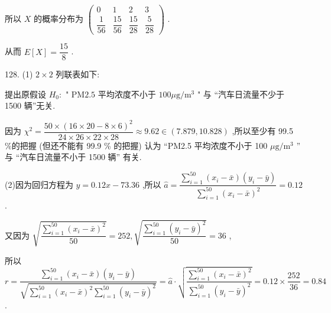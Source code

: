 所以 $X$ 的概率分布为 $\left( \begin{matrix} 0 & 1 & 2 & 3 \\  \dfrac{1}{56} & \dfrac{15}{56} & \dfrac{15}{28} & \dfrac{5}{28} \end{matrix}\right)$ .

从而 $E\left\lbrack  X\right\rbrack   = \dfrac{15}{8}$ .

128. (1) $2 \times  2$ 列联表如下:

\begin{center}
\end{center}

提出原假设 ${H}_{0} :$ " $\mathrm{{PM}}{2.5}$ 平均浓度不小于 ${100\mu }\mathrm{g}/{\mathrm{m}}^{3}$ " 与 “汽车日流量不少于 1500 辆”无关.

因为 ${\chi }^{2} = \dfrac{{50} \times  {\left( {16} \times  {20} - 8 \times  6\right) }^{2}}{{24} \times  {26} \times  {22} \times  {28}} \approx  {9.62} \in  \left( {{7.879},{10.828}}\right)$ ,所以至少有 99.5 \%的把握 (但还不能有 99.9 \% 的把握) 认为 “PM2.5 平均浓度不小于 100 $\mu \mathrm{g}/{\mathrm{m}}^{3}$ ” 与 “汽车日流量不小于 1500 辆” 有关.

(2)因为回归方程为 $y = {0.12x} - {73.36}$ ,所以 $\widehat{a} = \dfrac{\mathop{\sum }\limits_{{i = 1}}^{{50}}\left( {{x}_{i} - \bar{x}}\right) \left( {{y}_{i} - \bar{y}}\right) }{\mathop{\sum }\limits_{{i = 1}}^{{50}}{\left( {x}_{i} - \bar{x}\right) }^{2}} = {0.12}$ .

又因为 $\sqrt{\dfrac{\mathop{\sum }\limits_{{i = 1}}^{{50}}{\left( {x}_{i} - \bar{x}\right) }^{2}}{50}} = {252},\sqrt{\dfrac{\mathop{\sum }\limits_{{i = 1}}^{{50}}{\left( {y}_{i} - \bar{y}\right) }^{2}}{50}} = {36}$ ,

所以 $r = \dfrac{\mathop{\sum }\limits_{{i = 1}}^{{50}}\left( {{x}_{i} - \bar{x}}\right) \left( {{y}_{i} - \bar{y}}\right) }{\sqrt{\mathop{\sum }\limits_{{i = 1}}^{{50}}{\left( {x}_{i} - \bar{x}\right) }^{2}\mathop{\sum }\limits_{{i = 1}}^{{50}}{\left( {y}_{i} - \bar{y}\right) }^{2}}} = \widehat{a} \cdot  \sqrt{\dfrac{\mathop{\sum }\limits_{{i = 1}}^{{50}}{\left( {x}_{i} - \bar{x}\right) }^{2}}{\mathop{\sum }\limits_{{i = 1}}^{{50}}{\left( {y}_{i} - \bar{y}\right) }^{2}}} = {0.12} \times  \dfrac{252}{36} = {0.84}$ .

